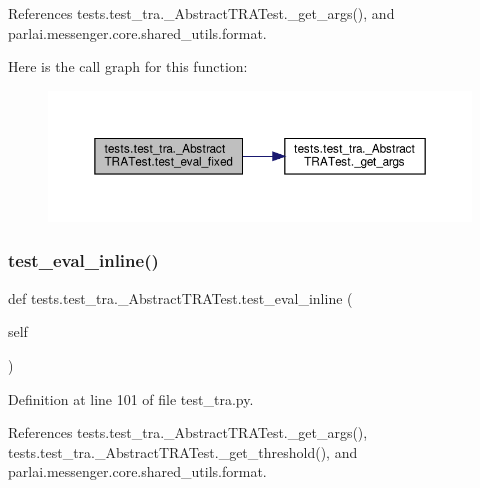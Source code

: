 References tests.\+test\+\_\+tra.\+\_\+\+Abstract\+T\+R\+A\+Test.\+\_\+get\+\_\+args(), and parlai.\+messenger.\+core.\+shared\+\_\+utils.\+format.

Here is the call graph for this function\+:
\nopagebreak
\begin{figure}[H]
\begin{center}
\leavevmode
\includegraphics[width=350pt]{classtests_1_1test__tra_1_1__AbstractTRATest_a34bce944e4e602830f52995c2b42ac81_cgraph}
\end{center}
\end{figure}
\mbox{\label{classtests_1_1test__tra_1_1__AbstractTRATest_af0ce31577227b0572fb440881dd48be0}} 
\subsubsection{\texorpdfstring{test\+\_\+eval\+\_\+inline()}{test\_eval\_inline()}}
{\footnotesize\ttfamily def tests.\+test\+\_\+tra.\+\_\+\+Abstract\+T\+R\+A\+Test.\+test\+\_\+eval\+\_\+inline (\begin{DoxyParamCaption}\item[{}]{self }\end{DoxyParamCaption})}



Definition at line 101 of file test\+\_\+tra.\+py.



References tests.\+test\+\_\+tra.\+\_\+\+Abstract\+T\+R\+A\+Test.\+\_\+get\+\_\+args(), tests.\+test\+\_\+tra.\+\_\+\+Abstract\+T\+R\+A\+Test.\+\_\+get\+\_\+threshold(), and parlai.\+messenger.\+core.\+shared\+\_\+utils.\+format.

